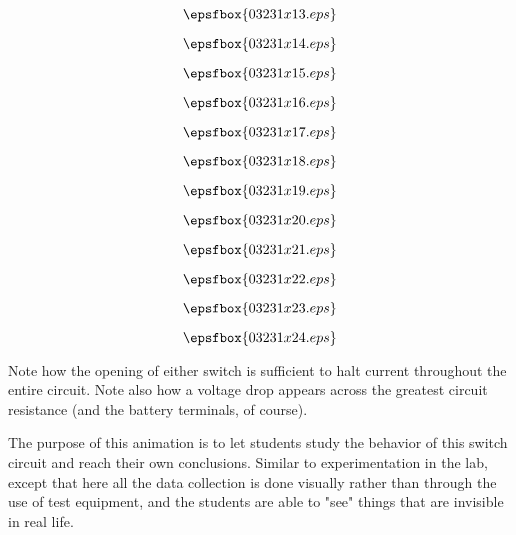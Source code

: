 \vfil \eject
$$\epsfbox{03231x13.eps}$$

\vfil \eject
$$\epsfbox{03231x14.eps}$$

\vfil \eject
$$\epsfbox{03231x15.eps}$$

\vfil \eject
$$\epsfbox{03231x16.eps}$$

\vfil \eject
$$\epsfbox{03231x17.eps}$$

\vfil \eject
$$\epsfbox{03231x18.eps}$$

\vfil \eject
$$\epsfbox{03231x19.eps}$$

\vfil \eject
$$\epsfbox{03231x20.eps}$$

\vfil \eject
$$\epsfbox{03231x21.eps}$$

\vfil \eject
$$\epsfbox{03231x22.eps}$$

\vfil \eject
$$\epsfbox{03231x23.eps}$$

\vfil \eject
$$\epsfbox{03231x24.eps}$$


\vfil \eject







Note how the opening of either switch is sufficient to halt current throughout the entire circuit.  Note also how a voltage drop appears across the greatest circuit resistance (and the battery terminals, of course).







The purpose of this animation is to let students study the behavior of this switch circuit and reach their own conclusions.  Similar to experimentation in the lab, except that here all the data collection is done visually rather than through the use of test equipment, and the students are able to "see" things that are invisible in real life.




